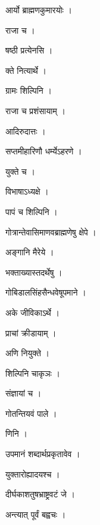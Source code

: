 \documentclass[10pt, openany, oneside]{book}
\begin{document}
\noindent आर्यो ब्राह्मणकुमारयोः ।

\noindent राजा च ।

\noindent षष्ठी प्रत्येनसि ।

\noindent क्ते नित्यार्थे ।

\noindent ग्रामः शिल्पिनि ।

\noindent राजा च प्रशंसायाम् ।

\noindent आदिरुदात्तः ।

\noindent सप्तमीहारिणौ धर्म्येऽहरणे ।

\noindent युक्ते च ।

\noindent विभाषाऽध्यक्षे ।

\noindent पापं च शिल्पिनि ।

\noindent गोत्रान्तेवासिमाणवब्राह्मणेषु क्षेपे ।

\noindent अङ्गानि मैरेये ।

\noindent भक्ताख्यास्तदर्थेषु ।

\noindent गोबिडालसिंहसैन्धवेषूपमाने ।

\noindent अके जीविकाऽर्थे ।

\noindent प्राचां क्रीडायाम् ।

\noindent अणि नियुक्ते ।

\noindent शिल्पिनि चाकृञः ।

\noindent संज्ञायां च ।

\noindent गोतन्तियवं पाले ।

\noindent णिनि ।

\noindent उपमानं शब्दार्थप्रकृतावेव ।

\noindent युक्तारोह्यादयश्च ।

\noindent दीर्घकाशतुषभ्राष्ट्रवटं जे ।

\noindent अन्त्यात् पूर्वं बह्वचः ।
\end{document}
